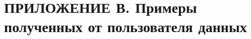 \section*{ПРИЛОЖЕНИЕ В. Примеры полученных от пользователя данных}
\label{chp:application-c}






\pagebreak 
